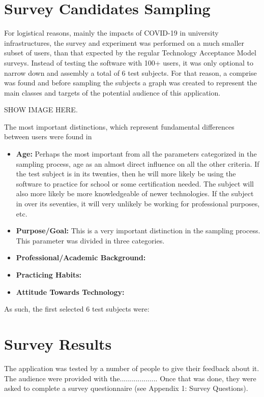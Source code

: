 \section{Survey Candidates Sampling}

For logistical reasons, mainly the impacts of COVID-19 in university infrastructures,
the survey and experiment was performed on a much smaller subset of users, than that 
expected by the regular Technology Acceptance Model surveys. Instead of testing the 
software with 100+ users, it was only optional to narrow down and assembly a total of
6 test subjects. For that reason, a comprise was found and before sampling the subjects
a graph was created to represent the main classes and targets of the potential audience 
of this application.

SHOW IMAGE HERE.

The most important distinctions, which represent fundamental differences between users
were found in 

\begin{itemize}
    \item \textbf{Age: } Perhaps the most important from all the parameters categorized
        in the sampling process, age as an almost direct influence on all the other 
        criteria. If the test subject is in its twenties, then he will more likely 
        be using the software to practice for school or some certification needed. The
        subject will also more likely be more knowledgeable of newer technologies. If
        the subject in over its seventies, it will very unlikely be working for
        professional purposes, etc. 

    \item \textbf{Purpose/Goal: } This is a very important distinction in the sampling 
        process. This parameter was divided in three categories.

    \item \textbf{Professional/Academic Background: }

    \item \textbf{Practicing Habits: }

    \item \textbf{Attitude Towards Technology: }

\end{itemize}

As such, the first selected 6 test subjects were: 

 
\section{Survey Results}
The application was tested by a number of people to give their feedback about it. The audience were provided with the................... Once that was done, they were asked to complete a survey questionnaire (see Appendix 1: Survey Questions). 

